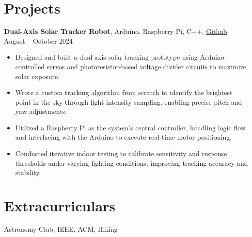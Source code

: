 \documentclass[11pt]{article}
\begin{document}
\vspace{-14pt}
\section*{Projects}
\vspace{5pt}
\textbf{Dual-Axis Solar Tracker Robot}, Arduino, Raspberry Pi, C++, \href{https://github.com/edwardasilva/SolarPanelProject}{Github} \hfill August -- October 2024
\vspace{-5pt}
\begin{itemize}
  \item Designed and built a dual-axis solar tracking prototype using Arduino-controlled servos and photoresistor-based voltage divider circuits to maximize solar exposure.
  \item Wrote a custom tracking algorithm from scratch to identify the brightest point in the sky through light intensity sampling, enabling precise pitch and yaw adjustments.
  \item Utilized a Raspberry Pi as the system's central controller, handling logic flow and interfacing with the Arduino to execute real-time motor positioning.
  \item Conducted iterative indoor testing to calibrate sensitivity and response thresholds under varying lighting conditions, improving tracking accuracy and stability.
\end{itemize}

\vspace{-14pt}

\section*{Extracurriculars}
\vspace{1pt}
\small Astronomy Club, IEEE, ACM, Hiking
\end{document}
